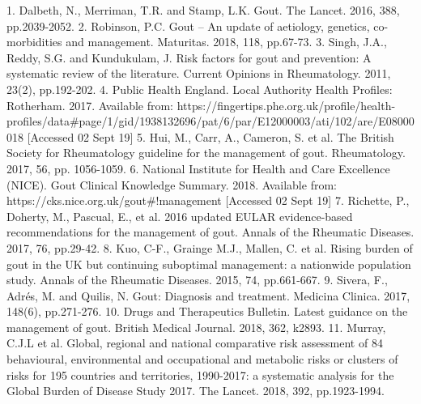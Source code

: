 \documentclass[paper=a4,fontsize=11pt,twocolumn]{article}
\begin{document}

1. Dalbeth, N., Merriman, T.R. and Stamp, L.K. Gout. The Lancet. 2016, 388, pp.2039-2052.
2. Robinson, P.C. Gout – An update of aetiology, genetics, co-morbidities and management. Maturitas. 2018, 118, pp.67-73.
3. Singh, J.A., Reddy, S.G. and Kundukulam, J. Risk factors for gout and prevention: A systematic review of the literature. Current Opinions in Rheumatology. 2011, 23(2), pp.192-202.
4. Public Health England. Local Authority Health Profiles: Rotherham. 2017. Available from: https://fingertips.phe.org.uk/profile/health-profiles/data#page/1/gid/1938132696/pat/6/par/E12000003/ati/102/are/E08000018 [Accessed 02 Sept 19]
5. Hui, M., Carr, A., Cameron, S. et al. The British Society for Rheumatology guideline for the management of gout. Rheumatology. 2017, 56, pp. 1056-1059.
6. National Institute for Health and Care Excellence (NICE). Gout Clinical Knowledge Summary. 2018. Available from: https://cks.nice.org.uk/gout#!management [Accessed 02 Sept 19]
7. Richette, P., Doherty, M., Pascual, E., et al. 2016 updated EULAR evidence-based recommendations for the management of gout. Annals of the Rheumatic Diseases. 2017, 76, pp.29-42.
8. Kuo, C-F., Grainge M.J., Mallen, C. et al. Rising burden of gout in the UK but continuing suboptimal management: a nationwide population study. Annals of the Rheumatic Diseases. 2015, 74, pp.661-667. 
9. Sivera, F., Adrés, M. and Quilis, N. Gout: Diagnosis and treatment. Medicina Clinica. 2017, 148(6), pp.271-276.
10. Drugs and Therapeutics Bulletin. Latest guidance on the management of gout. British Medical Journal. 2018, 362, k2893.
11. Murray, C.J.L et al. Global, regional and national comparative risk assessment of 84 behavioural, environmental and occupational and metabolic risks or clusters of risks for 195 countries and territories, 1990-2017: a systematic analysis for the Global Burden of Disease Study 2017. The Lancet. 2018, 392, pp.1923-1994.
\end{document}
